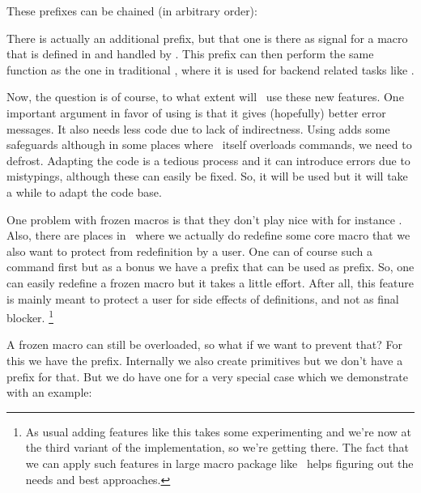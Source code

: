 These prefixes can be chained (in arbitrary order):

\starttyping[option=TEX]
\frozen\tolerant\protected\global{}
\stoptyping

There is actually an additional prefix, \type {\immediate} but that one is there
as signal for a macro that is defined in and handled by \LUA. This prefix can
then perform the same function as the one in traditional \TEX, where it is used
for backend related tasks like \type {\write}.

Now, the question is of course, to what extent will \CONTEXT\ use these new
features. One important argument in favor of using \type {\tolerant} is that it
gives (hopefully) better error messages. It also needs less code due to lack of
indirectness. Using \type {\frozen} adds some safeguards although in some places
where \CONTEXT\ itself overloads commands, we need to defrost. Adapting the code
is a tedious process and it can introduce errors due to mistypings, although
these can easily be fixed. So, it will be used but it will take a while to adapt
the code base.

One problem with frozen macros is that they don't play nice with for instance
\type {\futurelet}. Also, there are places in \CONTEXT\ where we actually do
redefine some core macro that we also want to protect from redefinition by a
user. One can of course \type {\unletfrozen} such a command first but as a bonus
we have a prefix \type {\overloaded} that can be used as prefix. So, one can easily
redefine a frozen macro but it takes a little effort. After all, this feature is
mainly meant to protect a user for side effects of definitions, and not as final
blocker. \footnote {As usual adding features like this takes some experimenting
and we're now at the third variant of the implementation, so we're getting there.
The fact that we can apply such features in large macro package like \CONTEXT\
helps figuring out the needs and best approaches.}

A frozen macro can still be overloaded, so what if we want to prevent that? For
this we have the \type {\permanent} prefix. Internally we also create primitives
but we don't have a prefix for that. But we do have one for a very special case
which we demonstrate with an example:

\startbuffer[example]
\def\FOO %
  {\noalign{\vskip10pt}}

\noaligned\protected\tolerant{}


